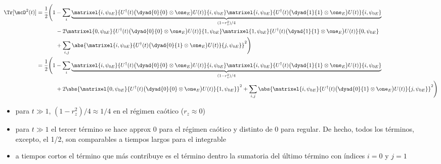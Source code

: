 \begin{align}
\Tr[\mcD^2(t)] &= 
\frac{1}{2} 
\Bigg(
1 - 
\sum_{i}
\underbrace{
\matrixel{i, \psi_{0E}}
{U^\dagger(t) \big(\dyad{0}{0} \otimes \one_E\big) U(t)}
{i, \psi_{0E}}
\matrixel{i, \psi_{0E}}
{U^\dagger(t) \big(\dyad{1}{1} \otimes \one_E\big) U(t)}
{i, \psi_{0E}}
}_{(1 - r_z^2)/4}
\nonumber \\
& \hspace*{12mm}
- 2 \matrixel{0, \psi_{0E}}
{U^\dagger(t) \big(\dyad{0}{0} \otimes \one_E\big) U(t)}
{1, \psi_{0E}}
\matrixel{1, \psi_{0E}}
{U^\dagger(t) \big(\dyad{1}{1} \otimes \one_E\big) U(t)}
{0, \psi_{0E}}
\nonumber \\
& \hspace*{12mm}
+
\sum_{i,j}
\abs{\matrixel{i, \psi_{0E}}
{U^\dagger(t) \big(\dyad{0}{1} \otimes \one_E\big) U(t)}
{j, \psi_{0E}}
}^2
\Bigg) \\
&= \frac{1}{2} 
\Bigg(
1 - 
\sum_{i}
\underbrace{
\matrixel{i, \psi_{0E}}
{U^\dagger(t) \big(\dyad{0}{0} \otimes \one_E\big) U(t)}
{i, \psi_{0E}}
\matrixel{i, \psi_{0E}}
{U^\dagger(t) \big(\dyad{1}{1} \otimes \one_E\big) U(t)}
{i, \psi_{0E}}
}_{(1 - r_z^2)/4}
\nonumber \\
& \hspace*{12mm}
+ 2 \abs{\matrixel{0, \psi_{0E}}
{U^\dagger(t) \big(\dyad{0}{0} \otimes \one_E\big) U(t)}
{1, \psi_{0E}}
}^2
+
\sum_{i,j}
\abs{\matrixel{i, \psi_{0E}}
{U^\dagger(t) \big(\dyad{0}{1} \otimes \one_E\big) U(t)}
{j, \psi_{0E}}
}^2
\Bigg) 
\end{align}
\begin{itemize}
\item para $t\gg 1$, $(1-r_z^2)/4 \approx 1/4$ en el régimen caótico 
($r_z\approx 0$)
\item para $t \gg 1$
el tercer término se hace approx 0 para el régimen caótico y distinto de 0 
para regular. De hecho, todos los términos, excepto, el 1/2, son comparables 
a tiempos largos para el integrable
\item a tiempos cortos el término que más contribuye es el término dentro la 
sumatoria del último término con índices $i=0$ y $j=1$
\end{itemize}